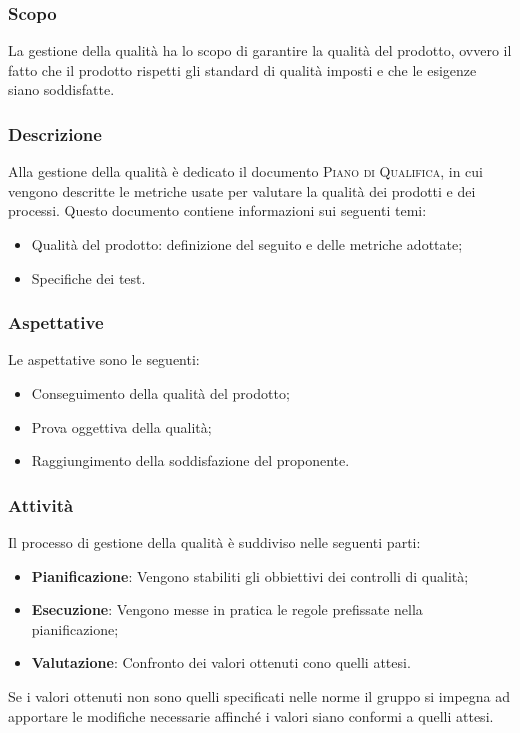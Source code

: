 \subsubsection{Scopo}
La gestione della qualità ha lo scopo di garantire la qualità del prodotto, ovvero il fatto che il prodotto rispetti gli 
standard di qualità imposti e che le esigenze siano soddisfatte.

\subsubsection{Descrizione}
Alla gestione della qualità è dedicato il documento \textsc{Piano di Qualifica}, in cui vengono descritte le metriche 
usate per valutare la qualità dei prodotti e dei processi. Questo documento contiene informazioni sui seguenti temi:
\begin{itemize}
    \item Qualità del prodotto: definizione del  seguito e delle metriche adottate;
    \item Specifiche dei test.
\end{itemize}

\subsubsection{Aspettative}
Le aspettative sono le seguenti:
\begin{itemize}
    \item Conseguimento della qualità del prodotto;
    \item Prova oggettiva della qualità;
    \item Raggiungimento della soddisfazione del proponente.
\end{itemize}

\subsubsection{Attività}
Il processo di gestione della qualità è suddiviso nelle seguenti parti:
\begin{itemize}
    \item \textbf{Pianificazione}: Vengono stabiliti gli obbiettivi dei controlli di qualità;
    \item \textbf{Esecuzione}: Vengono messe in pratica le regole prefissate nella pianificazione;
    \item \textbf{Valutazione}: Confronto dei valori ottenuti cono quelli attesi.
\end{itemize}
Se i valori ottenuti non sono quelli specificati nelle norme il gruppo si impegna ad apportare le modifiche necessarie 
affinché i valori siano conformi a quelli attesi.

